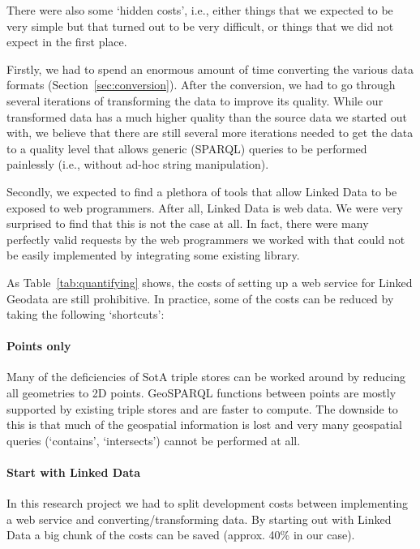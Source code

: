 \documentclass[a4paper]{scrartcl}
\begin{document}
There were also some `hidden costs', i.e., either things that we
expected to be very simple but that turned out to be very difficult,
or things that we did not expect in the first place.

Firstly, we had to spend an enormous amount of time converting the
various data formats (Section~\ref{sec:conversion}).  After the
conversion, we had to go through several iterations of transforming
the data to improve its quality.  While our transformed data has a
much higher quality than the source data we started out with, we
believe that there are still several more iterations needed to get the
data to a quality level that allows generic (SPARQL) queries to be
performed painlessly (i.e., without ad-hoc string manipulation).

Secondly, we expected to find a plethora of tools that allow Linked
Data to be exposed to web programmers.  After all, Linked Data is web
data.  We were very surprised to find that this is not the case at
all.  In fact, there were many perfectly valid requests by the web
programmers we worked with that could not be easily implemented by
integrating some existing library.

As Table~\ref{tab:quantifying} shows, the costs of setting up a web
service for Linked Geodata are still prohibitive.  In practice, some
of the costs can be reduced by taking the following `shortcuts':

\paragraph{Points only}
Many of the deficiencies of SotA triple stores can be worked around by
reducing all geometries to 2D points.  GeoSPARQL functions between
points are mostly supported by existing triple stores and are faster
to compute.  The downside to this is that much of the geospatial
information is lost and very many geospatial queries (`contains',
`intersects') cannot be performed at all.

\paragraph{Start with Linked Data}
In this research project we had to split development costs between
implementing a web service and converting/transforming data.  By
starting out with Linked Data a big chunk of the costs can be saved
(approx. 40\% in our case).
\end{document}

